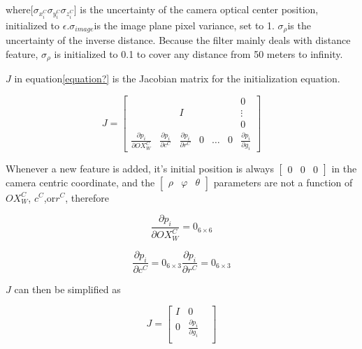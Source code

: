 \noindent where$[\sigma _{x_{i}^{C}}\sigma _{y_{i}^{C}}\sigma
_{z_{i}^{C}}$$]$ is the uncertainty of the camera optical center
position, initialized to $\epsilon $.$\sigma _{image}$is the image
plane pixel variance, set to 1. $\sigma _{\rho }$is the uncertainty of
the inverse distance. Because the filter mainly deals with distance
feature, $ \sigma _{\rho }$ is initialized to 0.1 to cover any
distance from 50 meters to infinity.

$J$ in equation\ref{equation?} is the Jacobian matrix for 
the initialization equation. 

\begin{equation}
J=\begin{bmatrix}
 & & & & & &0\\
 & &I& & & &\vdots\\ 
 & & & & & &0\\
\frac{\partial p_{i}}{\partial OX_{W}^{C}} &
\frac{\partial p_{i}}{\partial c^{C}} & 
\frac{\partial p_{i}}{\partial r^{C}} & 
0 & \ldots & 0 & 
\frac{\partial p_{i}}{\partial g_{i}} 
\end{bmatrix}
\end{equation}

Whenever a new feature is added, it's initial position is always $
\begin{bmatrix}0&0&0\end{bmatrix}$ in the camera centric coordinate,
and the $\begin{bmatrix}\rho&\varphi&\theta\end{bmatrix}$ parameters
are not a function of $ OX_{W}^{C}$, $c^{C}$,or$r^{C}$, therefore

\begin{equation}
\frac{\partial p_{i}}{\partial OX_{W}^{C}}=0_{6\times 6}
\end{equation}

\begin{equation}
\frac{\partial p_{i}}{\partial c^{C}}=0_{6\times 3}\frac{\partial 
p_{i}}{\partial r^{C}}= 0_{6\times 3}
\end{equation}

$J$ can then be simplified as

\begin{equation}
J=\begin{bmatrix}
I & 0 & \\
0 & \frac{\partial p_{i}}{\partial g_{i}} & \\
\end{bmatrix} 
\end{equation}


